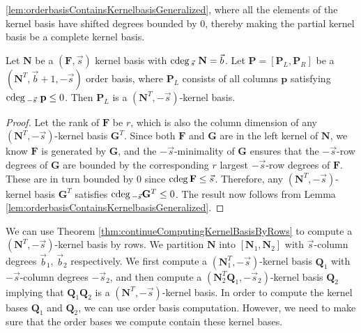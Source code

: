 \ref{lem:orderbasisContainsKernelbasisGeneralized}, where all the
elements of the kernel basis have shifted degrees bounded by $0$,
thereby making the partial kernel basis be a complete kernel basis. 
\begin{lem}
\label{lem:kernelBasisInOrderBasis} Let $\mathbf{N}$ be a $(\mathbf{F},\vec{s})$
kernel basis with ${\rm cdeg}\,_{\vec{s}}~\mathbf{N}=\vec{b}$. Let $\mathbf{P}=\left[\mathbf{P}_{L},\mathbf{P}_{R}\right]$
be a $\left(\mathbf{N}^{T},\vec{b}+1,-\vec{s}\right)$ order basis,
where $\mathbf{P}_{L}$ consists of all columns $\mathbf{p}$ satisfying
${\rm cdeg}\,_{-\vec{s}}~\mathbf{p}\le0$. Then $\mathbf{P}_{L}$ is a $(\mathbf{N}^{T},-\vec{s})$-kernel
basis.
 \end{lem}
\begin{proof}
Let the rank of $\mathbf{F}$ be $r$, which is also the column dimension
of any $(\mathbf{N}^{T},-\vec{s})$-kernel basis $\mathbf{G}^{T}$.
Since both $\mathbf{F}$ and $\mathbf{G}$ are in the left kernel
of $\mathbf{N}$, we know $\mathbf{F}$ is generated by $\mathbf{G}$,
and the $-\vec{s}$-minimality of $\mathbf{G}$ ensures that the $-\vec{s}$-row
degrees of $\mathbf{G}$ are bounded by the corresponding $r$ largest
$-\vec{s}$-row degrees of $\mathbf{F}$. These are in turn bounded
by $0$ since ${\rm cdeg}\,\mathbf{F}\le\vec{s}$. Therefore, any $(\mathbf{N}^{T},-\vec{s})$-kernel
basis $\mathbf{G}^{T}$ satisfies ${\rm cdeg}\,_{-\vec{s}}\mathbf{G}^{T}\le0$.
The result now follows from Lemma \ref{lem:orderbasisContainsKernelbasisGeneralized}. 
\end{proof}
We can use Theorem \ref{thm:continueComputingKernelBasisByRows} to
compute a $\left(\mathbf{N}^{T},-\vec{s}\right)$-kernel basis by
rows. We partition $\mathbf{N}$ into $\left[\mathbf{N}_{1},\mathbf{N}_{2}\right]$
with $\vec{s}$-column degrees $\vec{b}_{1}$, $\vec{b}_{2}$ respectively.
We first compute a $\left(\mathbf{N}_{1}^{T},-\vec{s}\right)$-kernel
basis $\mathbf{Q}_{1}$ with $-\vec{s}$-column degrees $-\vec{s}_{2}$,
and then compute a $\left(\mathbf{N}_{2}^{T}\mathbf{Q}_{1},-\vec{s}_{2}\right)$-kernel
basis $\mathbf{Q}_{2}$ implying that $\mathbf{Q}_{1}\mathbf{Q}_{2}$
is a $\left(\mathbf{N}^{T},-\vec{s}\right)$-kernel basis. In order
to compute the kernel bases $\mathbf{Q}_{1}$ and $\mathbf{Q}_{2}$,
we can use order basis computation. However, we need to make sure
that the order bases we compute contain these kernel bases.
